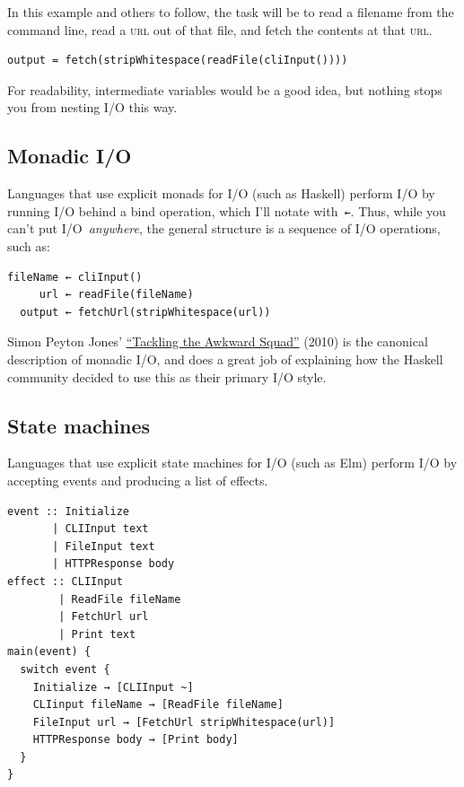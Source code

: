 \documentclass[twoside]{article}
\begin{document}
In this example and others to follow, the task will be to read a
filename from the command line, read a \textsc{url} out of that file, and fetch
the contents at that \textsc{url}.

\begin{lstlisting}[style=listingblock]
output = fetch(stripWhitespace(readFile(cliInput())))
\end{lstlisting}

\noindent
For readability, intermediate variables would be a good idea, but
nothing stops you from nesting I/O this way.

\subsection{Monadic I/O}\label{monadic-io}

Languages that use explicit monads for I/O (such as Haskell) perform I/O
by running I/O behind a bind operation, which I'll notate
with~\texttt{←}. Thus, while you can't put
I/O~\emph{anywhere}, the general structure is a sequence of I/O
operations, such as:

\begin{lstlisting}[style=listingblock]
fileName ← cliInput()
     url ← readFile(fileName)
  output ← fetchUrl(stripWhitespace(url))
\end{lstlisting}

\noindent
Simon Peyton Jones' \href{https://www.microsoft.com/en-us/research/wp-content/uploads/2016/07/mark.pdf}{``Tackling
the Awkward Squad''} (2010) is the canonical description of monadic I/O, and does
a great job of explaining how the Haskell community decided to use this
as their primary I/O style.

\subsection{State machines}\label{state-machines}

Languages that use explicit state machines for I/O (such as Elm) perform
I/O by accepting events and producing a list of effects.

\begin{lstlisting}[style=listingblock]
event :: Initialize
       | CLIInput text
       | FileInput text
       | HTTPResponse body
effect :: CLIInput
        | ReadFile fileName
        | FetchUrl url
        | Print text
main(event) {
  switch event {
    Initialize → [CLIInput ~]
    CLIinput fileName → [ReadFile fileName]
    FileInput url → [FetchUrl stripWhitespace(url)]
    HTTPResponse body → [Print body]
  }
}
\end{lstlisting}
\end{document}
